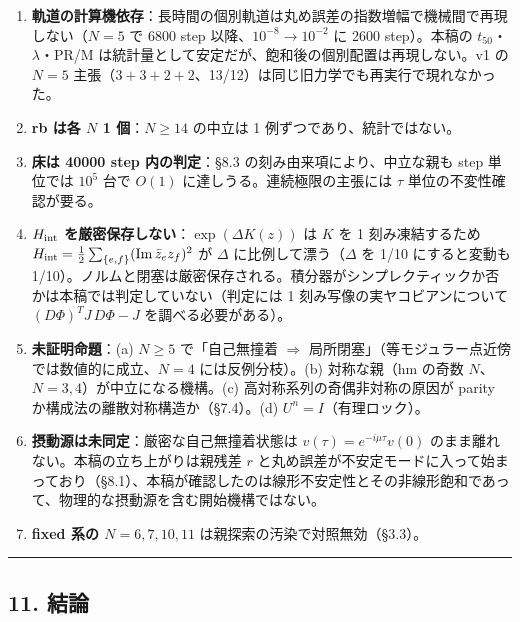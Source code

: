 \documentclass[
  10pt,
  a4paper,
]{ltjsarticle}
\providecommand{\tightlist}{%
  \setlength{\itemsep}{0pt}\setlength{\parskip}{0pt}}
\begin{document}
\begin{enumerate}
\def\labelenumi{\arabic{enumi}.}
\tightlist
\item
  \textbf{軌道の計算機依存}：長時間の個別軌道は丸め誤差の指数増幅で機械間で再現しない（\(N=5\)
  で 6800 step 以降、\(10^{-8}\to10^{-2}\) に 2600 step）。本稿の
  \(t_{50}\)・\(\lambda\)・PR/M
  は統計量として安定だが、飽和後の個別配置は再現しない。v1 の \(N=5\)
  主張（\(3+3+2+2\)、13/12）は同じ旧力学でも再実行で現れなかった。
\item
  \textbf{rb は各 \(N\) 1 個}：\(N\ge14\) の中立は 1
  例ずつであり、統計ではない。
\item
  \textbf{床は 40000 step 内の判定}：§8.3 の刻み由来項により、中立な親も
  step 単位では \(10^5\) 台で \(O(1)\) に達しうる。連続極限の主張には
  \(\tau\) 単位の不変性確認が要る。
\item
  \textbf{\(H_{\rm int}\) を厳密保存しない}：\(\exp(\Delta K(z))\) は
  \(K\) を 1 刻み凍結するため
  \(H_{\rm int}=\tfrac12\sum_{\{e,f\}}(\mathrm{Im}\,\bar z_ez_f)^2\) が
  \(\Delta\) に比例して漂う（\(\Delta\) を 1/10 にすると変動も
  1/10）。ノルムと閉塞は厳密保存される。積分器がシンプレクティックか否かは本稿では判定していない（判定には
  1 刻み写像の実ヤコビアンについて \((D\Phi)^TJ\,D\Phi-J\)
  を調べる必要がある）。
\item
  \textbf{未証明命題}：(a) \(N\ge5\) で「自己無撞着 \(\Rightarrow\)
  局所閉塞」（等モジュラー点近傍では数値的に成立、\(N=4\)
  には反例分枝）。(b) 対称な親（hm の奇数
  \(N\)、\(N=3,4\)）が中立になる機構。(c) 高対称系列の奇偶非対称の原因が
  parity か構成法の離散対称構造か（§7.4）。(d) \(U^n=I\)（有理ロック）。
\item
  \textbf{摂動源は未同定}：厳密な自己無撞着状態は
  \(v(\tau)=e^{-i\mu\tau}v(0)\) のまま離れない。本稿の立ち上がりは親残差
  \(r\)
  と丸め誤差が不安定モードに入って始まっており（§8.1）、本稿が確認したのは線形不安定性とその非線形飽和であって、物理的な摂動源を含む開始機構ではない。
\item
  \textbf{fixed 系の \(N=6,7,10,11\)} は親探索の汚染で対照無効（§3.3）。
\end{enumerate}

\begin{center}\rule{0.5\linewidth}{0.5pt}\end{center}

\subsection{11. 結論}\label{ux7d50ux8ad6}
\end{document}
